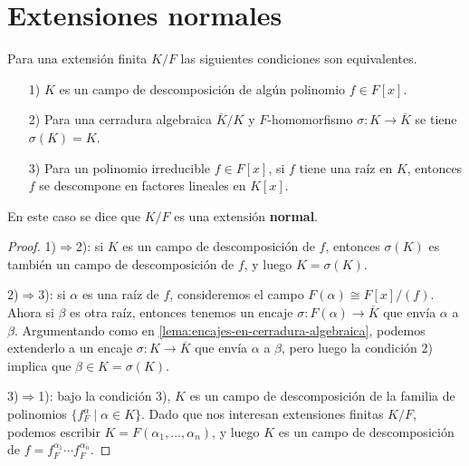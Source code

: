 
\section{Extensiones normales}

\begin{proposicion-definicion}
  \label{prop-dfn:extensiones-normales}
  Para una extensión finita $K/F$ las siguientes condiciones son equivalentes.

  \begin{enumerate}
  \item[1)] $K$ es un campo de descomposición de algún polinomio $f \in F[x]$.

  \item[2)] Para una cerradura algebraica $\overline{K}/K$ y $F$-homomorfismo
    $\sigma\colon K\to \overline{K}$ se tiene $\sigma (K) = K$.

  \item[3)] Para un polinomio irreducible $f \in F[x]$, si $f$ tiene una raíz en
    $K$, entonces $f$ se descompone en factores lineales en $K[x]$.
  \end{enumerate}

  En este caso se dice que $K/F$ es una extensión \textbf{normal}.

  \begin{proof}
    1)$\Rightarrow$2): si $K$ es un campo de descomposición de $f$, entonces
    $\sigma (K)$ es también un campo de descomposición de $f$, y luego
    $K = \sigma (K)$.

    2)$\Rightarrow$3): si $\alpha$ es una raíz de $f$, consideremos el campo
    $F (\alpha) \cong F[x]/(f)$. Ahora si $\beta$ es otra raíz, entonces tenemos
    un encaje $\sigma\colon F (\alpha) \to \overline{K}$ que envía
    $\alpha$ a $\beta$. Argumentando como en
    \ref{lema:encajes-en-cerradura-algebraica}, podemos extenderlo a un encaje
    $\sigma\colon K\to \overline{K}$ que envía $\alpha$ a $\beta$, pero luego
    la condición 2) implica que $\beta \in K = \sigma (K)$.

    3)$\Rightarrow$1): bajo la condición 3), $K$ es un campo de descomposición
    de la familia de polinomios $\{ f^\alpha_F \mid \alpha \in K \}$. Dado que
    nos interesan extensiones finitas $K/F$, podemos escribir
    $K = F (\alpha_1,\ldots,\alpha_n)$, y luego $K$ es un campo de
    descomposición de $f = f^{\alpha_1}_F \cdots f^{\alpha_n}_F$.
  \end{proof}
\end{proposicion-definicion}

